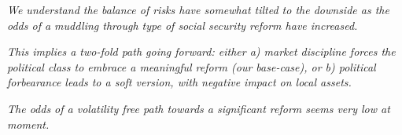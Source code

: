 \documentclass{report}
\date{}
\title{}
\begin{document}
\thispagestyle{firstpagestyle}
\JournalIssue
    \begin{tcolorbox}[colbak=red!5!white, colframe=red!0!white]
      \begin{compactitem}
      \item \textit{We understand the balance of risks have somewhat tilted to the downside as the odds of a muddling through type of social security reform have increased.}
      \item \textit{This implies a two-fold path going forward: either a) market discipline forces the political class to embrace a meaningful reform (our base-case),
                    or b) political forbearance leads to a soft version, with negative impact on local assets.}
      \item \textit{The odds of a volatility free path towards a significant reform seems very low at moment.}
      \end{compactitem}
    \end{tcolorbox}
\vspace{-0.5cm}
\end{document}
